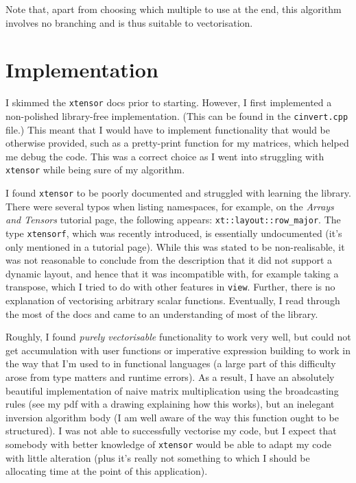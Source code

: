 \documentclass{amsart}
\begin{document}
Note that, apart from choosing which multiple to use at the end, this algorithm involves no branching and is thus suitable to vectorisation.

\section*{Implementation}

I skimmed the \texttt{xtensor} docs prior to starting. However, I first implemented a non-polished library-free implementation. (This can be found in the \texttt{cinvert.cpp} file.) This meant that I would have to implement functionality that would be otherwise provided, such as a pretty-print function for my matrices, which helped me debug the code. This was a correct choice as I went into struggling with \texttt{xtensor} while being sure of my algorithm.

I found \texttt{xtensor} to be poorly documented and struggled with learning the library. There were several typos when listing namespaces, for example, on the \textit{Arrays and Tensors} tutorial page, the following appears: \texttt{xt::layout::row\_major}. The type \texttt{xtensorf}, which was recently introduced, is essentially undocumented (it's only mentioned in a tutorial page). While this was stated to be non-realisable, it was not reasonable to conclude from the description that it did not support a dynamic layout, and hence that it was incompatible with, for example taking a transpose, which I tried to do with other features in \texttt{view}. Further, there is no explanation of vectorising arbitrary scalar functions. Eventually, I read through the most of the docs and came to an understanding of most of the library.

Roughly, I found \textit{purely vectorisable} functionality to work very well, but could not get accumulation with user functions or imperative expression building to work in the way that I'm used to in functional languages (a large part of this difficulty arose from type matters and runtime errors). As a result, I have an absolutely beautiful implementation of naive matrix multiplication using the broadcasting rules (see my pdf with a drawing explaining how this works), but an inelegant inversion algorithm body (I am well aware of the way this function ought to be structured). I was not able to successfully vectorise my code, but I expect that somebody with better knowledge of \texttt{xtensor} would be able to adapt my code with little alteration (plus it's really not something to which I should be allocating time at the point of this application).
\end{document}

